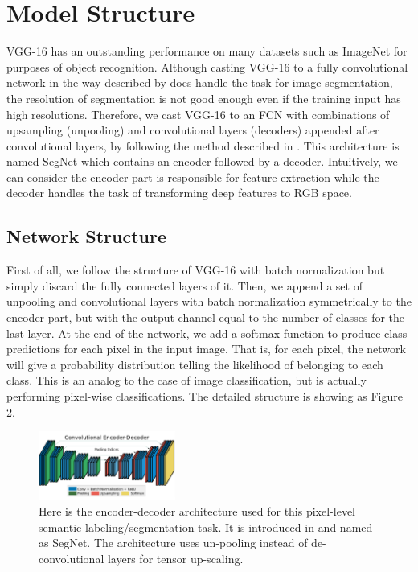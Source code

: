 \documentclass[10pt,twocolumn,letterpaper]{article}
\begin{document}
\section{Model Structure}
VGG-16 \cite{Simonyan14c} has an outstanding performance on many datasets such as ImageNet for purposes of object recognition. Although casting VGG-16 to a fully convolutional network in the way described by \cite{Long_2015_CVPR} does handle the task for image segmentation, the resolution of segmentation is not good enough even if the training input has high resolutions. Therefore, we cast VGG-16 to an FCN with combinations of upsampling (unpooling) and convolutional layers (decoders) appended after convolutional layers, by following the method described in \cite{badrinarayanan2015segnet2}. This architecture is named SegNet which contains an encoder followed by a decoder. Intuitively, we can consider the encoder part is responsible for feature extraction while the decoder handles the task of transforming deep features to RGB space.

\subsection{Network Structure}
First of all, we follow the structure of VGG-16 with batch normalization \cite{ioffe2015batch} but simply discard the fully connected layers of it. Then, we append a set of unpooling and convolutional layers with batch normalization symmetrically to the encoder part, but with the output channel equal to the number of classes for the last layer. At the end of the network, we add a softmax function to produce class predictions for each pixel in the input image. That is, for each pixel, the network will give a probability distribution telling the likelihood of belonging to each class. This is an analog to the case of image classification, but is actually performing pixel-wise classifications. The detailed structure is showing as Figure 2.

\begin{figure}[h]
	\centering
	\includegraphics[width=0.40\textwidth]{model.png}
	\caption{Here is the encoder-decoder architecture used for this pixel-level semantic labeling/segmentation task. It is introduced in \cite{badrinarayanan2015segnet2} and named as SegNet. The architecture uses un-pooling instead of de-convolutional layers for tensor up-scaling.}
	\label{fig:model}
\end{figure}
\end{document}
